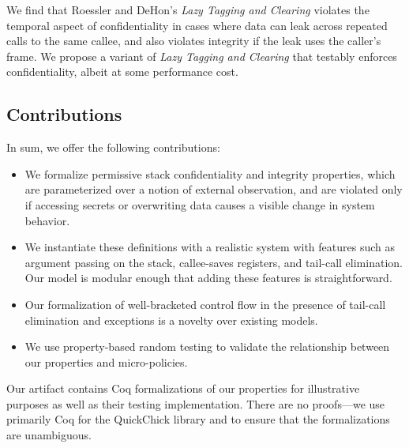 We find that Roessler and DeHon's \emph{Lazy Tagging and Clearing}
violates the temporal aspect of confidentiality in
cases where data can leak across repeated calls to the same callee,
and also violates integrity if the leak uses the caller's frame. We
propose a variant of {\em Lazy Tagging and Clearing} that testably enforces
confidentiality, albeit at some performance cost.
%

\subsection{Contributions}

In sum, we offer the following contributions:

\begin{itemize}
\item We formalize permissive stack confidentiality and integrity properties,
  which are parameterized over a notion of external
  observation, and are violated only if accessing secrets or overwriting
  data causes a visible change in system behavior.
\item We instantiate these definitions with a realistic
  system with features such as argument passing
  on the stack, callee-saves registers, and tail-call elimination.
  Our model is modular enough that adding these features is straightforward.
\item Our formalization of well-bracketed control flow in the presence of tail-call
  elimination \ifexceptions and exceptions \fi is a novelty over existing models.
\item We use property-based random testing to validate the relationship between
  our properties and micro-policies.
\end{itemize}

Our artifact contains Coq formalizations of our properties for illustrative purposes
as well as their testing implementation. There are no proofs---we use primarily Coq for the
QuickChick library and to ensure that the formalizations are unambiguous.
%
